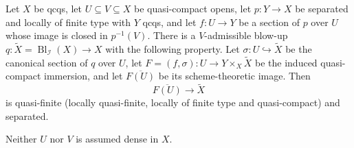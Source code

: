 \begin{lemma}
  \label{lemma:nagata-conrad-graph-closure-quasi-finite}
  \leanok

  Let $X$ be qcqs, let $U\subseteq V\subseteq X$ be quasi-compact opens, let
  $p\colon Y\to X$ be separated and locally of finite type with $Y$ qcqs, and
  let $f\colon U\to Y$ be a section of $p$ over $U$ whose image is closed in
  $p^{-1}(V)$.  There is a $V$-admissible blow-up
  $q\colon\widetilde X=\operatorname{Bl}_{\mathcal I}(X)\to X$ with the
  following property.  Let $\sigma\colon U\hookrightarrow\widetilde X$ be the
  canonical section of $q$ over $U$, let
  $F=(f,\sigma)\colon U\to Y\times_X\widetilde X$ be the induced quasi-compact
  immersion, and let $\overline{F(U)}$ be its scheme-theoretic image.  Then
  \[
    \overline{F(U)}\longrightarrow\widetilde X
  \]
  is quasi-finite (locally quasi-finite, locally of finite type and
  quasi-compact) and separated.

  Neither $U$ nor $V$ is assumed dense in $X$.
\end{lemma}

